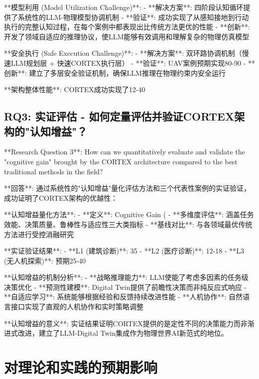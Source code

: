 **模型利用 (Model Utilization Challenge)**:
- **解决方案**: 四阶段认知循环提供了系统性的LLM-物理模型协调机制
- **验证**: 成功实现了从感知接地到行动执行的完整认知过程，在每个案例中都表现出比传统方法更优的性能
- **创新**: 开发了领域自适应的推理协议，使LLM能够有效调用和理解复杂的物理仿真模型

**安全执行 (Safe Execution Challenge)**:
- **解决方案**: 双环路协调机制（慢速LLM规划层 + 快速CORTEX执行层）
- **验证**: UAV案例预期实现80-90%
- **创新**: 建立了多层安全验证机制，确保LLM推理在物理约束内安全运行

**架构整体性能**: CORTEX成功实现了12-40%

\subsection{RQ3: 实证评估 - 如何定量评估并验证CORTEX架构的"认知增益"？}

**Research Question 3**: How can we quantitatively evaluate and validate the "cognitive gain" brought by the CORTEX architecture compared to the best traditional methods in the field?

**回答**: 通过系统性的"认知增益"量化评估方法和三个代表性案例的实证验证，成功证明了CORTEX架构的优越性：

**认知增益量化方法**:
- **定义**: Cognitive Gain (%
- **多维度评估**: 涵盖任务效能、决策质量、鲁棒性与适应性三大类指标
- **基线对比**: 与各领域最优传统方法进行受控消融研究

**实证验证结果**:
- **L1 (建筑诊断)**: 35%
- **L2 (医疗诊断)**: 12-18%
- **L3 (无人机探索)**: 预期25-40%

**认知增益的机制分析**:
- **战略推理能力**: LLM使能了考虑多因素的任务级决策优化
- **预测性建模**: Digital Twin提供了前瞻性决策而非纯反应式响应
- **自适应学习**: 系统能够根据经验和反馈持续改进性能
- **人机协作**: 自然语言接口实现了直观的人机协作和实时策略调整

**认知增益的意义**: 实证结果证明CORTEX提供的是定性不同的决策能力而非渐进式改进，建立了LLM-Digital Twin集成作为物理世界AI新范式的地位。

\section{对理论和实践的预期影响}

